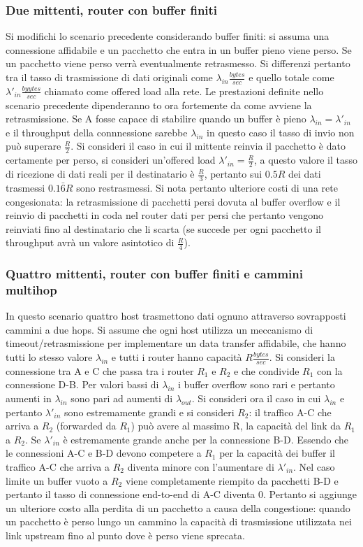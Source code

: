 \subsubsection{Due mittenti, router con buffer finiti}
Si modifichi lo scenario precedente considerando buffer finiti: si assuma una connessione affidabile e un pacchetto che entra in un buffer pieno viene
perso. Se un pacchetto viene perso verr\`a eventualmente retrasmesso. Si differenzi pertanto tra il tasso di trasmissione di dati originali come $
\lambda_{in}\frac{bytes}{sec}$ e quello totale come $\lambda'_{in}\frac{byytes}{sec}$ chiamato come offered load alla rete. Le prestazioni definite nello 
scenario precedente dipenderanno to ora fortemente da come avviene la retrasmissione. Se A fosse capace di stabilire quando un buffer \`e pieno $
\lambda_{in}=\lambda'_{in}$ e il throughput della connnessione sarebbe $\lambda_{in}$ in questo caso il tasso di invio non pu\`o superare $\frac{R}{2}$. Si 
consideri il caso in cui il mittente reinvia il pacchetto \`e dato certamente per perso, si consideri un'offered load $\lambda'_{in}=\frac{R}{2}$, a questo 
valore il tasso di ricezione di dati reali per il destinatario \`e $\frac{R}{3}$, pertanto sui $0.5R$ dei dati trasmessi $0.1\bar{6}R$ sono restrasmessi. Si 
nota pertanto ulteriore costi di una rete congesionata: la retrasmissione di pacchetti persi dovuta al buffer overflow e il reinvio di pacchetti in coda nel
router dati per persi che pertanto vengono reinviati fino al destinatario che li scarta (se succede per ogni pacchetto il throughput avr\`a un valore
asintotico di $\frac{R}{4}$).
\subsubsection{Quattro mittenti, router con buffer finiti e cammini multihop}
In questo scenario quattro host trasmettono dati ognuno attraverso sovrapposti cammini a due hops. Si assume che ogni host utilizza un meccanismo di 
timeout/retrasmissione per implementare un data transfer affidabile, che hanno tutti lo stesso valore $\lambda_{in}$ e tutti i router hanno capacit\`a
$R\frac{bytes}{sec}$. Si consideri la connessione tra A e C che passa tra i router $R_1$ e $R_2$ e che condivide  $R_1$ con la connessione D-B. Per valori
bassi di $\lambda_{in}$ i buffer overflow sono rari e pertanto aumenti in $\lambda_{in}$ sono pari ad aumenti di $\lambda_{out}$. Si consideri ora il caso
in cui $\lambda_{in}$ e pertanto $\lambda'_{in}$ sono estremamente grandi e si consideri $R_2$: il traffico A-C che arriva a $R_2$ (forwarded da $R_1$) 
pu\`o avere al massimo R, la capacit\`a del link da $R_1$ a $R_2$. Se $\lambda'_{in}$ \`e estremamente grande anche per la connessione B-D. Essendo che 
le connessioni A-C e B-D devono competere a $R_1$ per la capacit\`a dei buffer il traffico A-C che arriva a $R_2$ diventa minore con l'aumentare di 
$\lambda'_{in}$. Nel caso limite un buffer vuoto a $R_2$ viene completamente riempito da pacchetti B-D e pertanto il tasso di connessione end-to-end 
di A-C diventa 0. Pertanto si aggiunge un ulteriore costo alla perdita di un pacchetto a causa della congestione: quando un pacchetto \`e perso lungo un 
cammino la capacit\`a di trasmissione utilizzata nei link upstream fino al punto dove \`e perso viene sprecata. 
